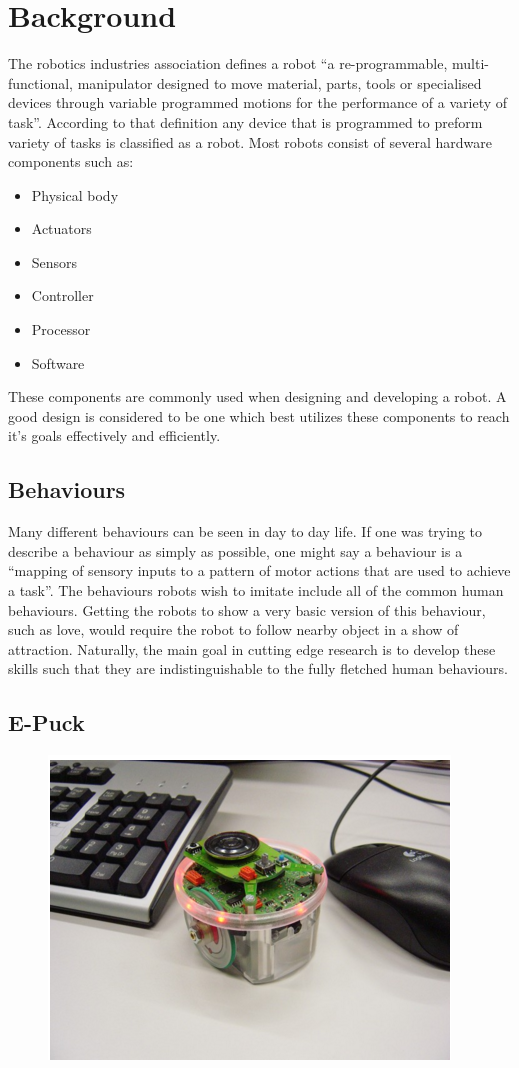 \section{Background} \label{sec:background}
The robotics industries association\cite{RIA} defines a robot ``a re-programmable, multi-functional, manipulator designed to move material, parts, tools or specialised devices through variable programmed motions for the performance of a variety of task''\cite{RIAdefinition}. According to that definition any device that is programmed to preform variety of tasks is classified as a robot. Most robots consist of several hardware components such as:
\begin{itemize}
	\item Physical body
	\item Actuators
	\item Sensors
	\item Controller
	\item Processor
	\item Software 
\end{itemize}
These components are commonly used when designing and developing a robot. A good design is considered to be one which best utilizes these components to reach it's goals effectively and efficiently.
\subsection{Behaviours}
Many different behaviours can be seen in day to day life. If one was trying to describe a behaviour as simply as possible, one might say a behaviour is a ``mapping of sensory inputs to a pattern of motor actions that are used to achieve a task''\cite{BehaviourDef}. The behaviours robots wish to imitate include all of the common human behaviours. Getting the robots to show a very basic version of this behaviour, such as love, would require the robot to follow nearby object in a show of attraction. Naturally, the main goal in cutting edge research is to develop these skills such that they are indistinguishable to the fully fletched human behaviours.

\subsection{E-Puck}

\begin{figure}
\centering
\includegraphics[width=0.7\linewidth]{figures/epcuk}
\caption{}
\label{fig:epcuk}
\end{figure}


